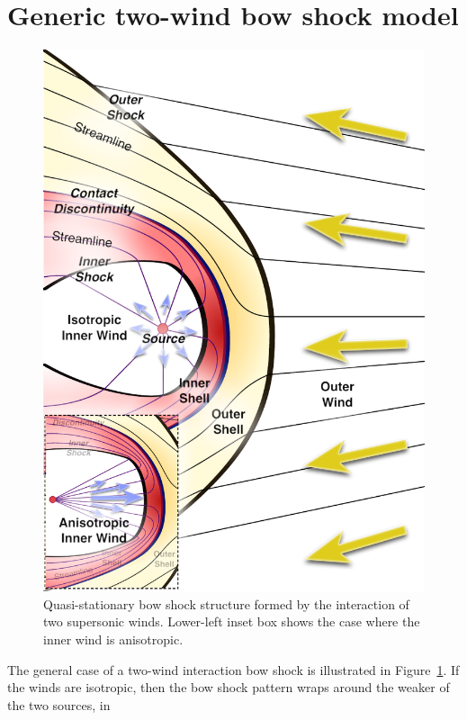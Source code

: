 \section{Generic two-wind bow shock model}
\label{sec:generic-model}

\begin{figure}
\includegraphics[width=\linewidth]{figs/generic-bowshock}
\caption{Quasi-stationary bow shock structure formed by the
  interaction of two supersonic winds.  Lower-left inset box shows the
  case where the inner wind is anisotropic.   
}
\label{fig:2-winds}
\end{figure}

The general case of a two-wind interaction bow shock is illustrated in
Figure~\ref{fig:2-winds}.  If the winds are isotropic, then the bow
shock pattern wraps around the weaker of the two sources, in 

